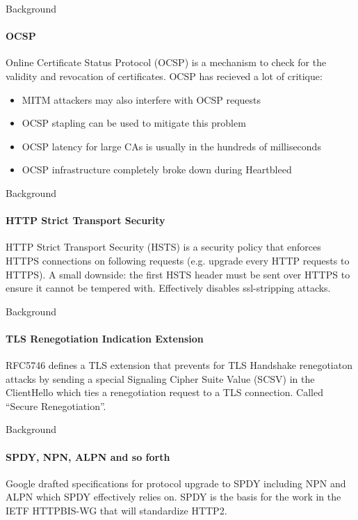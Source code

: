 \documentclass[hyperref={draft}]{beamer}
\begin{document}
\begin{frame}{Background}
  \framesubtitle{OCSP}
  Online Certificate Status Protocol (OCSP) is a mechanism to check for the validity and revocation of certificates.
  \newline
  \newline
  OCSP has recieved a lot of critique:
  \begin{itemize}
    \item MITM attackers may also interfere with OCSP requests
    \item OCSP stapling can be used to mitigate this problem
    \item OCSP latency for large CAs is usually in the hundreds of milliseconds
    \item OCSP infrastructure completely broke down during Heartbleed
  \end{itemize}
\end{frame}

\begin{frame}{Background}
  \framesubtitle{HTTP Strict Transport Security}
  HTTP Strict Transport Security (HSTS) is a security policy that enforces HTTPS connections on following requests (e.g. upgrade every HTTP requests to HTTPS).
  \newline
  \newline
  A small downside: the first HSTS header must be sent over HTTPS to ensure it cannot be tempered with.
  \newline
  \newline
  Effectively disables ssl-stripping attacks.
\end{frame}

\begin{frame}{Background}
  \framesubtitle{TLS Renegotiation Indication Extension}
  RFC5746 defines a TLS extension that prevents for TLS Handshake renegotiaton attacks by sending a special Signaling Cipher Suite Value (SCSV) in the ClientHello which ties a renegotiation request to a TLS connection.
  \newline
  \newline
  Called ``Secure Renegotiation''.
\end{frame}

\begin{frame}{Background}
  \framesubtitle{SPDY, NPN, ALPN and so forth}
  Google drafted specifications for protocol upgrade to SPDY including NPN and ALPN which SPDY effectively relies on. SPDY is the basis for the work in the IETF HTTPBIS-WG that will standardize HTTP2.
\end{frame}
\end{document}
